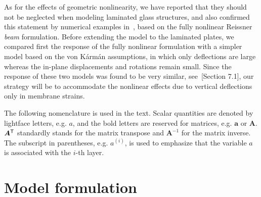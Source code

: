 \documentclass[11pt]{article}
\newcommand{\lay}[1]{^{(#1)}}
\newcommand{\M}[1]{{\boldsymbol #1}}
\begin{document}
As for the effects of geometric nonlinearity, we have reported that they should not be neglected when modeling laminated glass structures, and also confirmed this statement by numerical examples in~\cite{Zemanova:2014:NMFS}, based on the fully nonlinear Reissner \emph{beam} formulation. Before extending the model to the laminated plates, we compared first the response of the fully nonlinear formulation with a simpler model based on the von K\'{a}rm\'{a}n assumptions, in which only deflections are large whereas the in-plane displacements and rotations remain small. Since the response of these two models was found to be very similar, see~\cite{Zemanova:2014:NMLG}[Section 7.1], our strategy will be to accommodate the nonlinear effects due to vertical deflections only in membrane strains. 


The following nomenclature is used in the text. Scalar quantities are denoted by lightface letters, e.g. $a$, and the bold letters are reserved for matrices, e.g. $\M{a}$ or $\M{A}$. $\M{A}\trn$ standardly stands for the matrix transpose and $\M{A}^{-1}$ for the matrix inverse. The subscript in parentheses, e.g. $a\lay{i}$, is used to emphasize that the variable $a$ is associated with the $i$-th layer.

\section{Model formulation}\label{sec:formulation}
\end{document}
